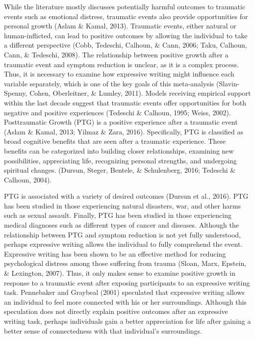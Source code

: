 \documentclass[english,man, mask]{apa6}
\theoremstyle{definition}
\theoremstyle{definition}
\theoremstyle{definition}
\theoremstyle{remark}
\begin{document}
While the literature mostly discusses potentially harmful outcomes to
traumatic events such as emotional distress, traumatic events also
provide opportunities for personal growth (Aslam \& Kamal, 2013).
Traumatic events, either natural or human-inflicted, can lead to
positive outcomes by allowing the individual to take a different
perspective (Cobb, Tedeschi, Calhoun, \& Cann, 2006; Taku, Calhoun,
Cann, \& Tedeschi, 2008). The relationship between positive growth after
a traumatic event and symptom reduction is unclear, as it is a complex
process. Thus, it is necessary to examine how expressive writing might
influence each variable separately, which is one of the key goals of
this meta-analysis (Slavin-Spenny, Cohen, Oberleitner, \& Lumley, 2011).
Models receiving empirical support within the last decade suggest that
traumatic events offer opportunities for both negative and positive
experiences (Tedeschi \& Calhoun, 1995; Weiss, 2002). Posttraumatic
Growth (PTG) is a positive experience after a traumatic event (Aslam \&
Kamal, 2013; Yilmaz \& Zara, 2016). Specifically, PTG is classified as
broad cognitive benefits that are seen after a traumatic experience.
These benefits can be categorized into building closer relationships,
examining new possibilities, appreciating life, recognizing personal
strengths, and undergoing spiritual changes. (Dursun, Steger, Bentele,
\& Schulenberg, 2016; Tedeschi \& Calhoun, 2004).

PTG is associated with a variety of desired outcomes (Dursun et al.,
2016). PTG has been studied in those experiencing natural disasters,
war, and other harms such as sexual assault. Finally, PTG has been
studied in those experiencing medical diagnoses such as different types
of cancer and diseases. Although the relationship between PTG and
symptom reduction is not yet fully understood, perhaps expressive
writing allows the individual to fully comprehend the event. Expressive
writing has been shown to be an effective method for reducing
psychological distress among those suffering from trauma (Sloan, Marx,
Epstein, \& Lexington, 2007). Thus, it only makes sense to examine
positive growth in response to a traumatic event after exposing
participants to an expressive writing task. Pennebaker and Graybeal
(2001) speculated that expressive writing allows an individual to feel
more connected with his or her surroundings. Although this speculation
does not directly explain positive outcomes after an expressive writing
task, perhaps individuals gain a better appreciation for life after
gaining a better sense of connectedness with that individual's
surroundings.
\end{document}

